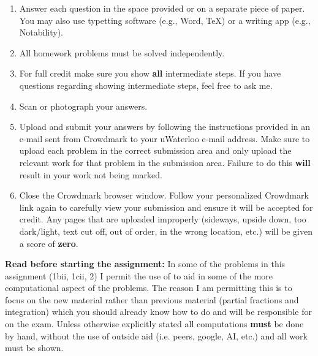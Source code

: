 \documentclass[11pt,a4paper]{article}
\begin{document}
	\begin{enumerate}
		
		\item Answer each question in the space provided or on a separate piece of paper. You may also use typetting software (e.g., Word, TeX) or a writing app (e.g., Notability). 
		
		\item All homework problems must be solved independently.
		
		\item For full credit make sure you show \textbf{all }intermediate steps. If you have questions regarding showing intermediate steps, feel free to ask me.
		

		
		\item Scan or photograph your answers. 
		
		\item Upload and submit your answers by following the instructions provided in an e-mail sent from Crowdmark to your uWaterloo e-mail address. Make sure to upload each problem in the correct submission area and only upload the relevant work for that problem in the submission area. Failure to do this \textbf{will} result in your work not being marked.
		
		
		\item Close the Crowdmark browser window. Follow your personalized Crowdmark link again to carefully view your submission and ensure it will be accepted for credit. Any pages that are uploaded improperly (sideways, upside down, too dark/light, text cut off, out of order, in the wrong location, etc.) will be given a score of \textbf{zero}.\\

		\vspace{0.5cm}
		
	\end{enumerate}
	
	\newpage
	
	\noindent \textbf{Read before starting the assignment:}	In some of the problems in this assignment (1bii, 1cii, 2) I permit the use of to aid in some of the more computational aspect of the problems. The reason I am permitting this is to focus on the new material rather than previous material (partial fractions and integration) which you should already know how to do and will be responsible for on the exam. Unless otherwise explicitly stated all computations \textbf{must} be done by hand, without the use of outside aid (i.e. peers, google, AI, etc.) and all work must be shown.
	
\end{document}

